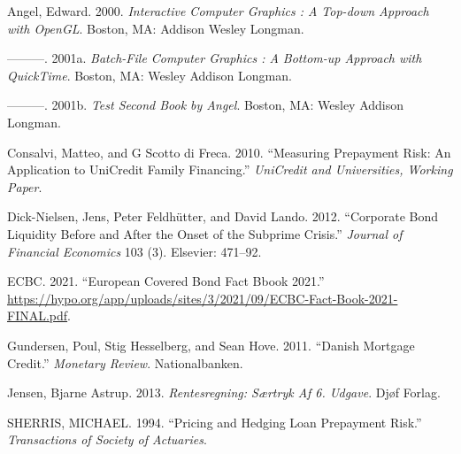 \documentclass[12pt,twoside]{reedthesis}
\newlength{\cslhangindent}
\newenvironment{CSLReferences}[2] %
 {%
  \setlength{\parindent}{0pt}
  \ifodd #1 \everypar{\setlength{\hangindent}{\cslhangindent}}\ignorespaces\fi
  \ifnum #2 > 0
  \setlength{\parskip}{#2\baselineskip}
  \fi
 }%
 {}
\begin{document}
\hypertarget{refs}{}
\begin{CSLReferences}{1}{0}
\leavevmode{}%
Angel, Edward. 2000. \emph{Interactive Computer Graphics : A Top-down Approach with OpenGL}. Boston, MA: Addison Wesley Longman.

\leavevmode{}%
---------. 2001a. \emph{Batch-File Computer Graphics : A Bottom-up Approach with QuickTime}. Boston, MA: Wesley Addison Longman.

\leavevmode{}%
---------. 2001b. \emph{Test Second Book by Angel}. Boston, MA: Wesley Addison Longman.

\leavevmode{}%
Consalvi, Matteo, and G Scotto di Freca. 2010. {``Measuring Prepayment Risk: An Application to UniCredit Family Financing.''} \emph{UniCredit and Universities, Working Paper}.

\leavevmode{}%
Dick-Nielsen, Jens, Peter Feldhütter, and David Lando. 2012. {``Corporate Bond Liquidity Before and After the Onset of the Subprime Crisis.''} \emph{Journal of Financial Economics} 103 (3). Elsevier: 471--92.

\leavevmode{}%
ECBC. 2021. {``European Covered Bond Fact Bbook 2021.''} \url{https://hypo.org/app/uploads/sites/3/2021/09/ECBC-Fact-Book-2021-FINAL.pdf}.

\leavevmode{}%
Gundersen, Poul, Stig Hesselberg, and Sean Hove. 2011. {``Danish Mortgage Credit.''} \emph{Monetary Review}. Nationalbanken.

\leavevmode{}%
Jensen, Bjarne Astrup. 2013. \emph{Rentesregning: S{æ}rtryk Af 6. Udgave}. Dj{ø}f Forlag.

\leavevmode{}%
SHERRIS, MICHAEL. 1994. {``Pricing and Hedging Loan Prepayment Risk.''} \emph{Transactions of Society of Actuaries}.

\end{CSLReferences}

\end{document}
